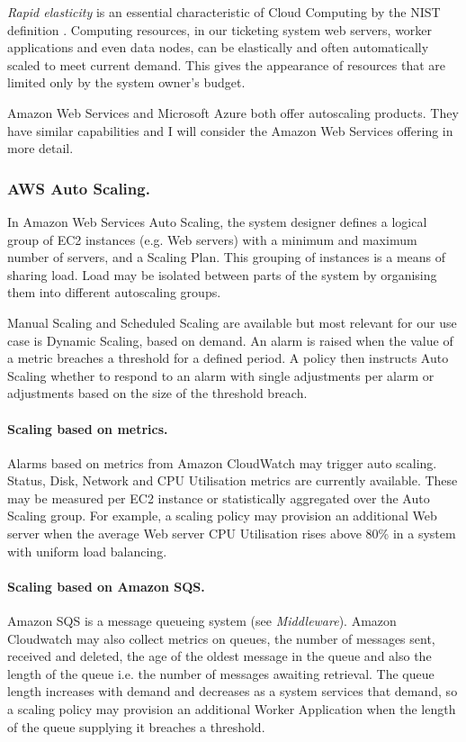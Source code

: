 \documentclass{llncs}
\begin{document}
{\itshape Rapid elasticity} is an essential characteristic of Cloud Computing by the NIST definition \cite{mell2011nist}.  Computing resources, in our ticketing system web servers, worker applications and even data nodes, can be elastically and often automatically scaled to meet current demand.  This gives the appearance of resources that are limited only by the system owner's budget.

Amazon Web Services \cite{awsautoscaling} and Microsoft Azure \cite{azurescalesets} both offer autoscaling products.  They have similar capabilities and I will consider the Amazon Web Services offering in more detail.

\subsubsection{AWS Auto Scaling.} In Amazon Web Services Auto Scaling, the system designer defines a logical group of EC2 instances (e.g. Web servers) with a minimum and maximum number of servers, and a Scaling Plan.  This grouping of instances is a means of sharing load.  Load may be isolated between parts of the system by organising them into different autoscaling groups.

Manual Scaling and Scheduled Scaling are available but most relevant for our use case is Dynamic Scaling, based on demand.  An alarm is raised when the value of a metric breaches a threshold for a defined period.  A policy then instructs Auto Scaling whether to respond to an alarm with single adjustments per alarm or adjustments based on the size of the threshold breach.

\paragraph{Scaling based on metrics.} Alarms based on metrics from Amazon CloudWatch may trigger auto scaling.  Status, Disk, Network and CPU Utilisation metrics are currently available. These may be measured per EC2 instance or statistically aggregated over the Auto Scaling group.  For example, a scaling policy may provision an additional Web server when the average Web server CPU Utilisation rises above 80\% in a system with uniform load balancing.

\paragraph{Scaling based on Amazon SQS.} Amazon SQS is a message queueing system (see {\itshape Middleware}).  Amazon Cloudwatch may also collect metrics on queues, the number of messages sent, received and deleted, the age of the oldest message in the queue and also the length of the queue i.e. the number of messages awaiting retrieval.  The queue length increases with demand and decreases as a system services that demand, so a scaling policy may provision an additional Worker Application when the length of the queue supplying it breaches a threshold.
\end{document}
